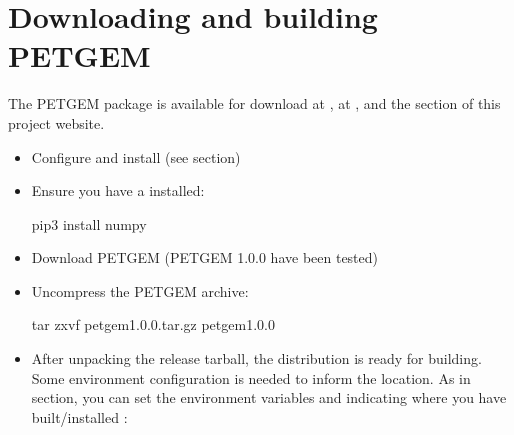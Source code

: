 \documentclass[letterpaper,10pt,english]{sphinxmanual}
\begin{document}
\section{Downloading and building PETGEM}
\label{\detokenize{Installation:downloading-and-building-petgem}}\label{\detokenize{Installation:downloadingbuildingpetgem}}
The PETGEM package is available for download at
, at
,
and the {\hyperref[\detokenize{Download:download}]{}} section of this project website.
\begin{itemize}
\item {} 
Configure and install  (see {\hyperref[\detokenize{Installation:install}]{}} section)

\item {} 
Ensure you have a  installed:

\begin{sphinxVerbatim}[commandchars=\\\{\}]
\PYGZdl{} pip3 install numpy
\end{sphinxVerbatim}

\item {} 
Download PETGEM (PETGEM 1.0.0 have been tested)

\item {} 
Uncompress the PETGEM archive:

\begin{sphinxVerbatim}[commandchars=\\\{\}]
\PYGZdl{} tar zxvf petgem\PYGZhy{}1.0.0.tar.gz
\PYGZdl{}  petgem\PYGZhy{}1.0.0
\end{sphinxVerbatim}

\item {} 
After unpacking the release tarball, the distribution is ready for building. Some environment configuration is needed to inform the  location. As in {\hyperref[\detokenize{Installation:install}]{}} section, you can set the environment variables  and  indicating where you have built/installed :


\end{itemize}
\end{document}
